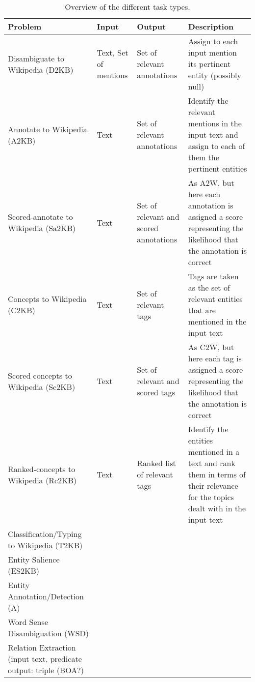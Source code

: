 \begin{table*}[th]
\centering
\begin{tabular}{@{}p{3cm}p{2cm}p{3cm}p{7cm}@{}}
\toprule
Problem & Input & Output & Description \\ \midrule


Disambiguate to Wikipedia (D2KB) &
Text, Set of mentions &
Set of relevant annotations &
Assign to each input mention its pertinent entity (possibly null) \\ \midrule

Annotate to Wikipedia (A2KB) &
Text &
Set of relevant annotations &
Identify the relevant mentions in the input text and assign to each of them the pertinent entities \\ \midrule

Scored-annotate to Wikipedia (Sa2KB) &
Text &
Set of relevant and scored annotations &
As A2W, but here each annotation is assigned a score representing the likelihood that the annotation is correct \\ \midrule

Concepts to Wikipedia (C2KB) &
Text &
Set of relevant tags &
Tags are taken as the set of relevant entities that are mentioned in the input text \\ \midrule

Scored concepts to Wikipedia (Sc2KB) &
Text &
Set of relevant and scored tags &
As C2W, but here each tag is assigned a score representing the likelihood that the annotation is correct \\ \midrule

Ranked-concepts to Wikipedia (Rc2KB) &
Text &
Ranked list of relevant tags &
Identify the entities mentioned in a text and rank them in terms of their relevance for the topics dealt with in the
input text\\ \midrule

Classification/Typing to Wikipedia (T2KB) &
 &
 &
\\ \midrule

Entity Salience (ES2KB) &
  &
  &
\\\midrule

Entity Annotation/Detection (A) &
  &
  &
\\
\midrule
Word Sense Disambiguation (WSD) &
  &
  &
\\
\midrule
Relation Extraction (input text, predicate output: triple (BOA?) &
  &
  &\\
\bottomrule
\end{tabular}
\caption{Overview of the different task types.}
\label{tab:tasktypes}
\end{table*}